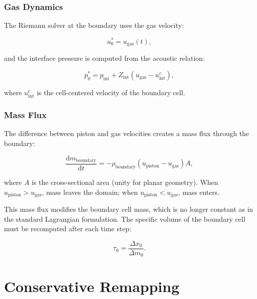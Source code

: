 \documentclass[12pt,a4paper]{article}
\newcommand{\dd}{\mathrm{d}}
\begin{document}
\subsubsection{Gas Dynamics}

The Riemann solver at the boundary uses the gas velocity:

\begin{equation}
    u_0^* = u_{\text{gas}}(t),
    \label{eq:porous_riemann}
\end{equation}

and the interface pressure is computed from the acoustic relation:

\begin{equation}
    p_0^* = p_{\text{int}} + Z_{\text{int}} (u_{\text{gas}} - u_{\text{int}}^c),
    \label{eq:porous_pressure}
\end{equation}

\noindent where $u_{\text{int}}^c$ is the cell-centered velocity of the boundary cell.

\subsubsection{Mass Flux}

The difference between piston and gas velocities creates a mass flux through the boundary:

\begin{equation}
    \frac{\dd m_{\text{boundary}}}{\dd t} = -\rho_{\text{boundary}} (u_{\text{piston}} - u_{\text{gas}}) A,
    \label{eq:mass_flux}
\end{equation}

\noindent where $A$ is the cross-sectional area (unity for planar geometry). When $u_{\text{piston}} > u_{\text{gas}}$, mass leaves the domain; when $u_{\text{piston}} < u_{\text{gas}}$, mass enters.

This mass flux modifies the boundary cell mass, which is no longer constant as in the standard Lagrangian formulation. The specific volume of the boundary cell must be recomputed after each time step:

\begin{equation}
    \tau_0 = \frac{\Delta x_0}{\Delta m_0}.
    \label{eq:boundary_tau}
\end{equation}

\section{Conservative Remapping}
\label{sec:remapping}
\end{document}
